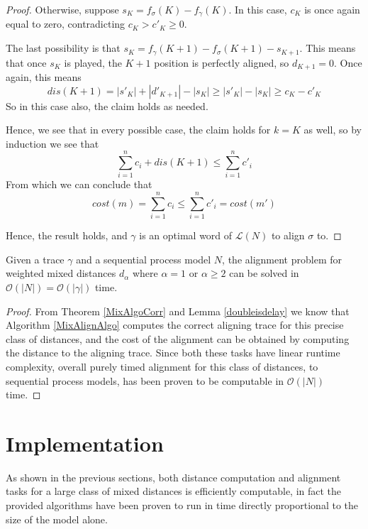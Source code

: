 \documentclass[runningheads]{llncs}
\begin{document}
\begin{proof}
    Otherwise, suppose $s_K = f_\sigma(K) - f_\gamma(K)$. 
    In this case, $c_K$ is once again equal to zero, contradicting $c_K > c'_K \geq 0$. 
    
    The last possibility is that $s_K = f_\gamma(K+1) - f_\sigma(K+1) -s_{K+1}$. 
    This means that once $s_K$ is played, the $K+1$ position is perfectly aligned, so $d_{K+1} = 0$. 
    Once again, this means $$dis(K+1) = |s'_K| + |d'_{K+1}| - |s_K| \geq |s'_K|  - |s_K| \geq c_K - c'_K$$ So in this case also, the claim holds as needed. 
    
    Hence, we see that in every possible case, the claim holds for $k= K$ as well, so by induction we see that $$\sum_{i = 1}^{n} c_i + dis(K+1) \leq \sum_{i = 1}^{n} c'_i$$ From which we can conclude that $$cost(m) = \sum_{i = 1}^{n} c_i  \leq \sum_{i = 1}^{n} c'_i = cost(m')$$
    
    Hence, the result holds, and $\gamma$ is an optimal word of $\mathcal{L}(N)$ to align $\sigma$ to. 
    
    \end{proof}


\begin{theorem}
	Given a trace $\gamma$ and a sequential process model $N$, the alignment problem for weighted mixed distances $d_{\alpha}$ where $\alpha = 1 $ or $\alpha \geq 2$ can be solved in $\mathcal{O}(|N|) = \mathcal{O}(|\gamma|)$ time. 
\end{theorem}
\begin{proof}
	\color{firstrevision}From Theorem \ref{MixAlgoCorr} and Lemma \ref{doubleisdelay} we know that Algorithm \ref{MixAlignAlgo} computes the correct aligning trace for this precise class of distances, and the cost of the alignment can be obtained by computing the distance to the aligning trace. 
    Since both these tasks have linear runtime complexity, overall purely timed alignment for this class of distances, to sequential process models, has been proven to be computable in $\mathcal{O}(|N|)$ time.\color{black}
	\end{proof}

\section{Implementation}
\color{firstrevision}
As shown in the previous sections, both distance computation and alignment tasks for a large class of mixed distances is efficiently computable, in fact the provided algorithms have been proven to run in time directly proportional to the size of the model alone.\color{black}
\end{document}
